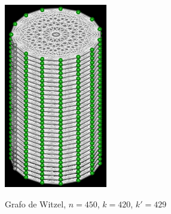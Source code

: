 \begin{figure}[htb]
\centering
\includegraphics[width=0.4\textwidth]{img/witzel.png}
\label{fig:example-witzel}
\caption{Grafo de Witzel, $n=450$, $k=420$, $k'=429$}
\end{figure}

